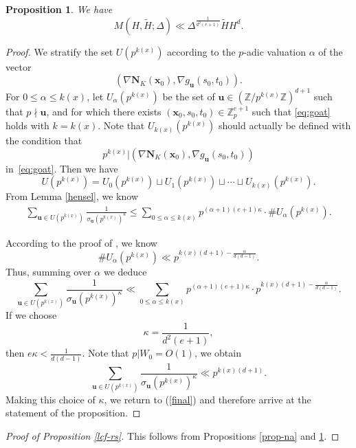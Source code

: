 \documentclass[reqno, 11pt]{amsart}
\renewcommand{\leq}{\leqslant}
\newtheorem{prop}[theorem]{Proposition}
\theoremstyle{definition}
\theoremstyle{definition}
\renewcommand{\leq}{\leqslant}
\newcommand{\uu}{\mathbf{u}}
\newcommand{\xx}{\mathbf{x}}
\newcommand{\ZZ}{\mathbb{Z}}
\newcommand{\NNN}{\mathbf{N}}
\numberwithin{equation}{section}
\begin{document}
\begin{prop}\label{BST-P-9.6}
	We have 
	$$M(H, \tilde{H}; \Delta) \ll \Delta^{\frac{1}{d^2(e+1)}} \tilde{H} H^d.$$
\end{prop}
\begin{proof}
	We stratify the set $U(p^{k(x)})$ according to the $p$-adic valuation $\alpha$ of the vector 
$$ (\nabla \NNN_K(\xx_0), \nabla g_\uu(s_0, t_0)).$$
For $0\leq \alpha\leq k(x)$, let $U_\alpha(p^{k(x)})$ be the set of $\uu \in (\ZZ/p^{k(x)}\ZZ)^{d+1}$ such that  $p\nmid \uu$, and for which there exists
$ (\xx_0,s_0, t_0)\in \ZZ_p^{e+1}$ such that \eqref{eq:goat} holds with $k=k(x)$.
Note that $U_{k(x)}(p^{k(x)})$ should actually be defined with the condition that 
$$p^{k(x)} | (\nabla \NNN_K(\xx_0), \nabla g_\uu(s_0, t_0))$$ in~\eqref{eq:goat}. Then we have
$$
U(p^{k(x)})=U_0(p^{k(x)})\sqcup U_1(p^{k(x)})\sqcup \cdots 
\sqcup
U_{{k(x)}}(p^{k(x)}).
$$
From Lemma \ref{hensel}, we know
\begin{align*}
\sum_{\uu\in U(p^{k(x)})} \frac{1}{\sigma_\uu(p^{k(x)})^\kappa}
\leq \sum_{0\leq \alpha\leq {k(x)}} 
p^{(\alpha+1)(e+1) \kappa} \cdot \#U_\alpha(p^{k(x)}).
\end{align*}

According to the proof of \cite[Proposition 9.6]{BST}, we know 
$$\#U_\alpha(p^{k(x)}) \ll p^{k(x) (d+1) - \frac{\alpha}{d(d-1)}}.$$
Thus, summing over $\alpha$ we deduce
$$\sum_{\uu \in U(p^{k(x)})} \frac{1}{\sigma_\uu(p^{k(x)})^\kappa} \ll \sum_{0 \leq \alpha \leq k(x)} p^{(\alpha+1)(e+1)\kappa} \cdot p^{k(x)(d+1) - \frac{\alpha}{d(d-1)}}.$$
If we choose
$$\kappa = \frac{1}{d^2(e+1)},$$
then $e \kappa < \frac{1}{d(d-1)}$. Note that $p|W_0 = O(1)$, we obtain
$$\sum_{\uu \in U(p^{k(x)})} \frac{1}{\sigma_\uu(p^{k(x)})^\kappa} \ll p^{k(x)(d+1)}.$$
Making this choice of $\kappa$, we return to (\ref{final}) and therefore arrive at the statement of the proposition.
\end{proof}

\begin{proof}[Proof of Proposition \ref{lcf-rs}]
	This follows from Propositions \ref{prop-na} and \ref{BST-P-9.6}.
\end{proof}












\end{document}

